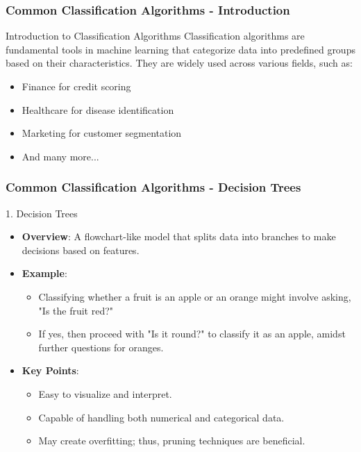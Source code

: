 \documentclass[aspectratio=169]{beamer}
\begin{document}
\begin{frame}[fragile]
    \frametitle{Common Classification Algorithms - Introduction}
    \begin{block}{Introduction to Classification Algorithms}
        Classification algorithms are fundamental tools in machine learning that categorize data into predefined groups based on their characteristics. 
        They are widely used across various fields, such as:
        \begin{itemize}
            \item Finance for credit scoring
            \item Healthcare for disease identification
            \item Marketing for customer segmentation
            \item And many more...
        \end{itemize}
    \end{block}
\end{frame}

\begin{frame}[fragile]
    \frametitle{Common Classification Algorithms - Decision Trees}
    \begin{block}{1. Decision Trees}
        \begin{itemize}
            \item \textbf{Overview}: A flowchart-like model that splits data into branches to make decisions based on features.
            \item \textbf{Example}: 
            \begin{itemize}
                \item Classifying whether a fruit is an apple or an orange might involve asking, "Is the fruit red?"
                \item If yes, then proceed with "Is it round?" to classify it as an apple, amidst further questions for oranges.
            \end{itemize}
            \item \textbf{Key Points}:
            \begin{itemize}
                \item Easy to visualize and interpret.
                \item Capable of handling both numerical and categorical data.
                \item May create overfitting; thus, pruning techniques are beneficial.
            \end{itemize}
        \end{itemize}
    \end{block}
\end{frame}
\end{document}
